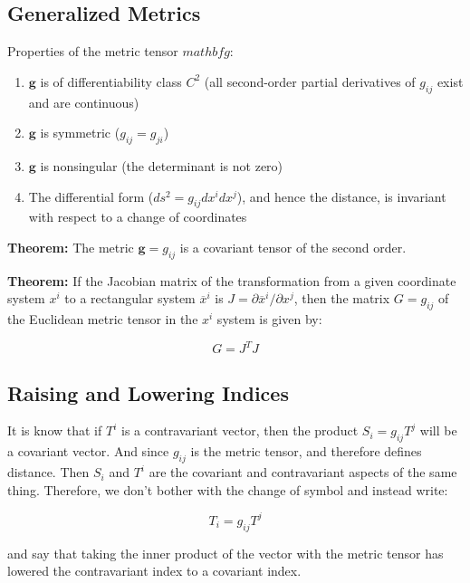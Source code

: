 \documentclass{article}
\begin{document}
\subsection{Generalized Metrics}

Properties of the metric tensor $mathbf{g}$:

\begin{enumerate}
	\item $\mathbf{g}$ is of differentiability class $C^2$ (all second-order partial derivatives of $g_{ij}$ exist and are continuous)
	\item $\mathbf{g}$ is symmetric ($g_{ij} = g_{ji}$)
	\item $\mathbf{g}$ is nonsingular (the determinant is not zero)
	\item The differential form ($ds^2 = g_{ij} dx^i dx^j$), and hence the distance, is invariant with respect to a change of coordinates
\end{enumerate}

\noindent \textbf{Theorem: }
The metric $\mathbf{g} = g_{ij}$ is a covariant tensor of the second order.

\noindent \textbf{Theorem: }
If the Jacobian matrix of the transformation from a given coordinate system $x^i$ to a rectangular system $\overline{x}^i$ is $J = \partial \overline{ x }^i / \partial x^j$,
then the matrix $G = g_{ij}$ of the Euclidean metric tensor in the $x^i$ system is given by:

\begin{equation}
	G = J^T J
\end{equation}


\subsection{Raising and Lowering Indices}

It is know that if $T^i$ is a contravariant vector, then the product $S_i = g_{ij} T^j$ will be a covariant vector.  And since $g_{ij}$ is the metric tensor, and therefore defines distance.
Then $S_i$ and $T^i$ are the covariant and contravariant aspects of the same thing.  Therefore, we don't bother with the change of symbol and instead write:

\begin{equation}
	T_i = g_{ij} T^j
\end{equation}

\noindent
and say that taking the inner product of the vector with the metric tensor has lowered the contravariant index to a covariant index.
\end{document}
